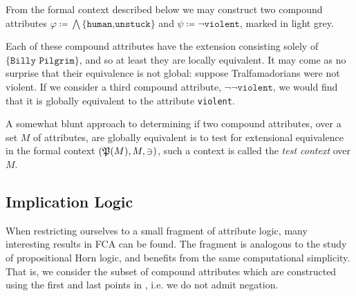 \begin{example}
	From the formal context described below we may construct two compound attributes $\varphi \coloneqq \bigwedge \{\texttt
	{human,unstuck}\}$ and $\psi \coloneqq \neg \texttt{violent}$, marked in light grey.
	\begin{figure}[H]
		\centering
		\small
		\begin{cxt}
			\label{cxt:slaughterhouse5}   
			   \atr{\textcolor{gray!70}{$\varphi$}}\atr{\textcolor{gray!70}{$\psi$}}

			   
		\end{cxt}
	\end{figure}
	Each of these compound attributes have the extension consisting solely of $\{\texttt{Billy Pilgrim}\}$, and so at
	least they are locally equivalent. It may come as no surprise that their equivalence is not global: suppose
	Tralfamadorians were not violent. If we consider a third compound attribute, $\neg \neg \texttt{violent}$, we would find
	that it is globally equivalent to the attribute \texttt{violent}.
\end{example}

A somewhat blunt approach to determining if two compound attributes, over a set $M$ of attributes, are globally equivalent
is to test for extensional equivalence in the formal context $(\mathfrak{P}({M}), M, \ni)$, such a context is called the \textit{test
context} over $M$.

\subsection{Implication Logic}
\label{subsection:implication-logic}

When restricting ourselves to a small fragment of attribute logic, many interesting results in FCA can be found. The
fragment is analogous to the study of propositional Horn logic, and benefits from the same computational simplicity.
That is, we consider the subset of compound attributes which are constructed using the first and last points in ,
i.e. we do not admit negation.


